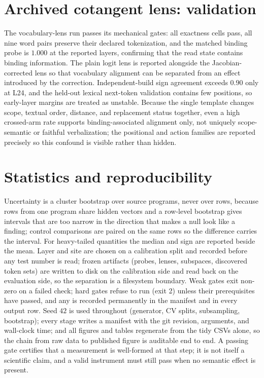 \section{Archived cotangent lens: validation}
\label{app:jlens}
The vocabulary-lens run passes its mechanical gates: all exactness cells pass, all
nine word pairs preserve their declared tokenization, and the matched binding
probe is $1.000$ at the reported layers, confirming that the read state contains
binding information. The plain logit lens is reported alongside the
Jacobian-corrected lens so that vocabulary alignment can be separated from an
effect introduced by the correction. Independent-build sign agreement exceeds
$0.90$ only at L24, and the held-out lexical next-token validation contains few
positions, so early-layer margins are treated as unstable. Because the single
template changes scope, textual order, distance, and replacement status together,
even a high crossed-arm rate supports binding-associated alignment only, not
uniquely scope-semantic or faithful verbalization; the positional and action
families are reported precisely so this confound is visible rather than hidden.

\section{Statistics and reproducibility}
\label{app:stats}
Uncertainty is a cluster bootstrap over source programs, never over rows, because
rows from one program share hidden vectors and a row-level bootstrap gives
intervals that are too narrow in the direction that makes a null look like a
finding; control comparisons are paired on the same rows so the difference carries
the interval. For heavy-tailed quantities the median and sign are reported beside
the mean. Layer and site are chosen on a calibration split and recorded before any
test number is read; frozen artifacts (probes, lenses, subspaces, discovered token
sets) are written to disk on the calibration side and read back on the evaluation
side, so the separation is a filesystem boundary. Weak gates exit non-zero on a
failed check; hard gates refuse to run (exit 2) unless their prerequisites have
passed, and any  is recorded permanently in the manifest and
in every output row. Seed $42$ is used throughout (generator, CV splits,
subsampling, bootstrap); every stage writes a manifest with the git revision,
arguments, and wall-clock time; and all figures and tables regenerate from the
tidy CSVs alone, so the chain from raw data to published figure is auditable end
to end. A passing gate certifies that a measurement is well-formed at that step;
it is not itself a scientific claim, and a valid instrument must still pass when no
semantic effect is present.
